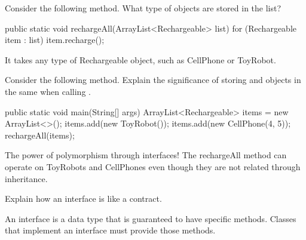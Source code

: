 \Q Consider the following  method.
What type of objects are stored in the list?

\begin{javalst}
public static void rechargeAll(ArrayList<Rechargeable> list) {
    for (Rechargeable item : list) {
        item.recharge();
    }
}
\end{javalst}

\begin{answer}[3em]
It takes any type of Rechargeable object, such as CellPhone or ToyRobot.
\end{answer}


\Q \label{key3}
Consider the following  method.
Explain the significance of storing  and  objects in the same  when calling .

\begin{javalst}
public static void main(String[] args) {
    ArrayList<Rechargeable> items = new ArrayList<>();
    items.add(new ToyRobot());
    items.add(new CellPhone(4, 5));
    rechargeAll(items);
}
\end{javalst}

\begin{answer}[5em]
The power of polymorphism through interfaces!
The rechargeAll method can operate on ToyRobots and CellPhones even though they are not related through inheritance.
\end{answer}


\Q Explain how an interface is like a contract.

\begin{answer}
An interface is a data type that is guaranteed to have specific methods.
Classes that implement an interface must provide those methods.
\end{answer}
